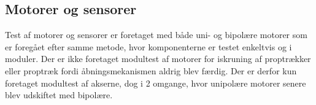 \subsection{Motorer og sensorer}
Test af motorer og sensorer er foretaget med både uni- og bipolære motorer som er foregået efter samme metode, hvor komponenterne er testet enkeltvis og i moduler. Der er ikke foretaget modultest af motorer for iskruning af proptrækker eller proptræk fordi åbningsmekanismen aldrig blev færdig. Der er derfor kun foretaget modultest af akserne, dog i 2 omgange, hvor unipolære motorer senere blev udskiftet med bipolære.